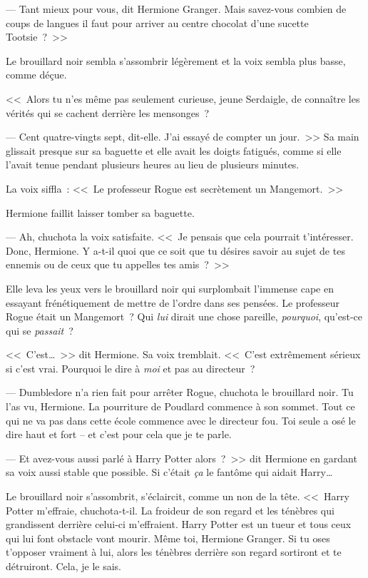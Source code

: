 --- Tant mieux pour vous, dit Hermione Granger. Mais savez-vous combien de coups de langues il faut pour arriver au centre chocolat d'une sucette Tootsie~?~>>

Le brouillard noir sembla s'assombrir légèrement et la voix sembla plus basse, comme déçue.

<<~Alors tu n'es même pas seulement curieuse, jeune Serdaigle, de connaître les vérités qui se cachent derrière les mensonges~?

--- Cent quatre-vingts sept, dit-elle. J'ai essayé de compter un jour.~>> Sa main glissait presque sur sa baguette et elle avait les doigts fatigués, comme si elle l'avait tenue pendant plusieurs heures au lieu de plusieurs minutes.

La voix siffla~: <<~Le professeur Rogue est secrètement un Mangemort.~>>

Hermione faillit laisser tomber sa baguette.

--- Ah, chuchota la voix satisfaite. <<~Je pensais que cela pourrait t'intéresser. Donc, Hermione. Y a-t-il quoi que ce soit que tu désires savoir au sujet de tes ennemis ou de ceux que tu appelles tes amis~?~>>

Elle leva les yeux vers le brouillard noir qui surplombait l'immense cape en essayant frénétiquement de mettre de l'ordre dans ses pensées. Le professeur Rogue était un Mangemort~? Qui \emph{lui} dirait une chose pareille, \emph{pourquoi}, qu'est-ce qui se \emph{passait}~?

<<~C'est…~>> dit Hermione. Sa voix tremblait. <<~C'est extrêmement sérieux si c'est vrai. Pourquoi le dire à \emph{moi} et pas au directeur~?

--- Dumbledore n'a rien fait pour arrêter Rogue, chuchota le brouillard noir. Tu l'as vu, Hermione. La pourriture de Poudlard commence à son sommet. Tout ce qui ne va pas dans cette école commence avec le directeur fou. Toi seule a osé le dire haut et fort -- et c'est pour cela que je te parle.

--- Et avez-vous aussi parlé à Harry Potter alors~?~>> dit Hermione en gardant sa voix aussi stable que possible. Si c'était \emph{ça} le fantôme qui aidait Harry…

Le brouillard noir s'assombrit, s'éclaircit, comme un non de la tête. <<~Harry Potter m'effraie, chuchota-t-il. La froideur de son regard et les ténèbres qui grandissent derrière celui-ci m'effraient. Harry Potter est un tueur et tous ceux qui lui font obstacle vont mourir. Même toi, Hermione Granger. Si tu oses t'opposer vraiment à lui, alors les ténèbres derrière son regard sortiront et te détruiront. Cela, je le sais.

